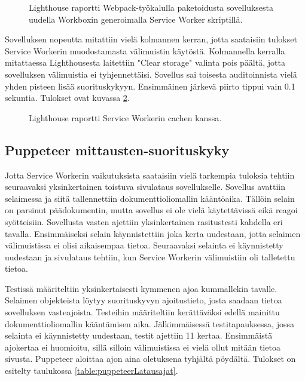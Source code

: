 \documentclass{tktltiki}
\begin{document}
\begin{figure}[h]
\begin{center}
\caption{Lighthouse raportti Webpack-työkalulla paketoidusta sovelluksesta uudella Workboxin generoimalla Service Worker skriptillä.}
\label{Lighthouse raportti 2}
\end{center}
\end{figure}

\clearpage

Sovelluksen nopeutta mitattiin vielä kolmannen kerran, jotta saataisiin tulokset Service Workerin muodostamasta välimuistin käytöstä. Kolmannella kerralla mitattaessa Lighthousesta laitettiin "Clear storage" valinta pois päältä, jotta sovelluksen välimuistia ei tyhjennettäisi. Sovellus sai toisesta auditoinnista vielä yhden pisteen lisää suorituskykyyn. Ensimmäinen järkevä piirto tippui vain 0.1 sekuntia. Tulokset ovat kuvassa \ref{Lighthouse raportti 3}.

\begin{figure}[h]
\begin{center}
\caption{Lighthouse raportti Service Workerin cachen kanssa.}
\label{Lighthouse raportti 3}
\end{center}
\end{figure}

\subsection{Puppeteer mittausten-suorituskyky}

Jotta Service Workerin vaikutuksista saataisiin vielä tarkempia tuloksia tehtiin seuraavaksi yksinkertainen toistuva sivulataus sovellukselle. Sovellus avattiin selaimessa ja siitä tallennettiin dokumenttioliomallin kääntöaika. Tällöin selain on parsinut päädokumentin, mutta sovellus ei ole vielä käytettävissä eikä reagoi syötteisiin. Sovellusta vasten ajettiin yksinkertainen rasitustesti kahdella eri tavalla. Ensimmäiseksi selain käynnistettiin joka kerta uudestaan, jotta selaimen välimuistissa ei olisi aikaisempaa tietoa. Seuraavaksi selainta ei käynnistetty uudestaan ja sivulataus tehtiin, kun Service Workerin välimuistiin oli talletettu tietoa. 

Testissä määriteltiin yksinkertaisesti kymmenen ajoa kummallekin tavalle. Selaimen objekteista löytyy suorituskyvyn ajoitustieto, josta saadaan tietoa sovelluksen vasteajoista. Testeihin määriteltiin kerättäväksi edellä mainittu dokumenttioliomallin kääntämisen aika. Jälkimmäisessä testitapauksessa, jossa selainta ei käynnistetty uudestaan, testit ajettiin 11 kertaa. Ensimmäistä ajokertaa ei huomioitu, sillä silloin välimuistissa ei vielä ollut mitään tietoa sivusta. Puppeteer aloittaa ajon aina oletuksena tyhjältä pöydältä. Tulokset on esitelty taulukossa \ref{table:puppeteerLatausajat}.
\end{document}
